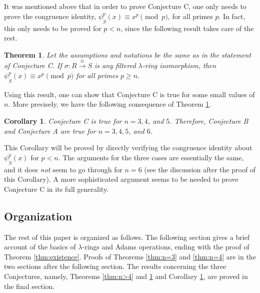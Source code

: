 \documentclass[reqno,11pt]{amsart}
\numberwithin{equation}{subsection}  %
\newtheorem{thm}[subsection]{Theorem}
\newtheorem{cor}[subsection]{Corollary}
\begin{document}
It was mentioned above that in order to prove Conjecture C, one only needs to prove the congruence identity, $\psi^p_{\tilde{S}}(x) \equiv x^p \pmod{p}$, for all primes $p$.  In fact, this only needs to be proved for $p < n$, since the following result takes care of the rest.



\medskip
\begin{thm}
\label{thm:p>n}
Let the assumptions and notations be the same as in the statement of Conjecture C.  If $\sigma \colon R \xrightarrow{\cong} S$ is any filtered $\lambda$-ring isomorphism, then $\psi^p_{\tilde{S}}(x) \equiv x^p \pmod{p}$ for all primes $p \geq n$.
\end{thm}


Using this result, one can show that Conjecture C is true for some small values of $n$.  More precisely, we have the following consequence of Theorem \ref{thm:p>n}.


\medskip
\begin{cor}
\label{cor:p>n}
Conjecture C is true for $n = 3, 4$, and $5$.  Therefore, Conjecture B and Conjecture A are true for $n = 3, 4, 5$, and $6$.
\end{cor}


This Corollary will be proved by directly verifying the congruence identity about $\psi^p_{\tilde{S}}(x)$ for $p < n$.  The arguments for the three cases are essentially the same, and it does \emph{not} seem to go through for $n = 6$ (see the discussion after the proof of this Corollary).  A more sophisticated argument seems to be needed to prove Conjecture C in its full generality.





\subsection*{Organization}

The rest of this paper is organized as follows.  The following section gives a brief account of the basics of $\lambda$-rings and Adams operations, ending with the proof of Theorem \ref{thm:existence}.  Proofs of Theorems \ref{thm:n=3} and \ref{thm:n=4} are in the two sections after the following section.  The results concerning the three Conjectures, namely, Theorems \ref{thm:n>4} and \ref{thm:p>n} and Corollary \ref{cor:p>n}, are proved in the final section.
\end{document}
